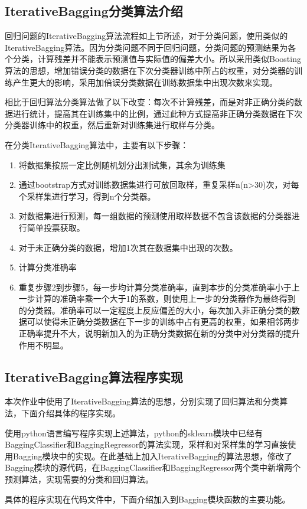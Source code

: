 \documentclass[a4paper,oneside,12pt]{article}
\begin{document}
\begin{spacing}{1.5}
\subsection{IterativeBagging分类算法介绍}
回归问题的IterativeBagging算法流程如上节所述，对于分类问题，使用类似的IterativeBagging算法。因为分类问题不同于回归问题，分类问题的预测结果为各个分类，计算残差并不能表示预测值与实际值的偏差大小。所以采用类似Boosting算法的思想，增加错误分类的数据在下次分类器训练中所占的权重，对分类器的训练产生更大的影响，采用加倍误分类数据在训练数据集中出现次数来实现。\par
相比于回归算法分类算法做了以下改变：每次不计算残差，而是对非正确分类的数据进行统计，提高其在训练集中的比例，通过此种方式提高非正确分类数据在下次分类器训练中的权重，然后重新对训练集进行取样与分类。\par
在分类IterativeBagging算法中，主要有以下步骤：
\begin{enumerate}
\item 将数据集按照一定比例随机划分出测试集，其余为训练集
\item 通过bootstrap方式对训练数据集进行可放回取样，重复采样n(n>30)次，对每个采样集进行学习，得到n个分类器。
\item 对数据集进行预测，每一组数据的预测使用取样数据不包含该数据的分类器进行简单投票获取。
\item 对于未正确分类的数据，增加1次其在数据集中出现的次数。
\item 计算分类准确率
\item 重复步骤2到步骤5，每一步均计算分类准确率，直到本步的分类准确率小于上一步计算的准确率乘一个大于1的系数，则使用上一步的分类器作为最终得到的分类器。准确率可以一定程度上反应偏差的大小，每次加入非正确分类的数据可以使得未正确分类数据在下一步的训练中占有更高的权重，如果相邻两步正确率提升不大，说明新加入的为正确分类数据在新的分类中对分类器的提升作用不明显。
\end{enumerate}
\subsection{IterativeBagging算法程序实现}
本次作业中使用了IterativeBagging算法的思想，分别实现了回归算法和分类算法，下面介绍具体的程序实现。\par
使用python语言编写程序实现上述算法，python的sklearn模块中已经有BaggingClassifier和BaggingRegressor的算法实现，采样和对采样集的学习直接使用Bagging模块中的实现。在此基础上加入IterativeBagging的算法思想，修改了Bagging模块的源代码，在BaggingClassifier和BaggingRegressor两个类中新增两个预测算法，实现需要的分类和回归算法。\par
具体的程序实现在代码文件中，下面介绍加入到Bagging模块函数的主要功能。\par

\end{spacing}
\end{document}
